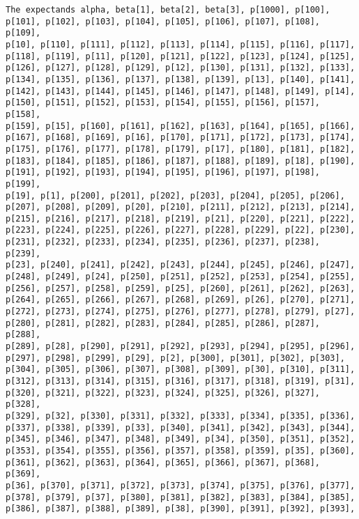 \documentclass[
  letterpaper,
  DIV=11,
  numbers=noendperiod]{scrartcl}
\begin{document}
\begin{verbatim}
The expectands alpha, beta[1], beta[2], beta[3], p[1000], p[100],
p[101], p[102], p[103], p[104], p[105], p[106], p[107], p[108], p[109],
p[10], p[110], p[111], p[112], p[113], p[114], p[115], p[116], p[117],
p[118], p[119], p[11], p[120], p[121], p[122], p[123], p[124], p[125],
p[126], p[127], p[128], p[129], p[12], p[130], p[131], p[132], p[133],
p[134], p[135], p[136], p[137], p[138], p[139], p[13], p[140], p[141],
p[142], p[143], p[144], p[145], p[146], p[147], p[148], p[149], p[14],
p[150], p[151], p[152], p[153], p[154], p[155], p[156], p[157], p[158],
p[159], p[15], p[160], p[161], p[162], p[163], p[164], p[165], p[166],
p[167], p[168], p[169], p[16], p[170], p[171], p[172], p[173], p[174],
p[175], p[176], p[177], p[178], p[179], p[17], p[180], p[181], p[182],
p[183], p[184], p[185], p[186], p[187], p[188], p[189], p[18], p[190],
p[191], p[192], p[193], p[194], p[195], p[196], p[197], p[198], p[199],
p[19], p[1], p[200], p[201], p[202], p[203], p[204], p[205], p[206],
p[207], p[208], p[209], p[20], p[210], p[211], p[212], p[213], p[214],
p[215], p[216], p[217], p[218], p[219], p[21], p[220], p[221], p[222],
p[223], p[224], p[225], p[226], p[227], p[228], p[229], p[22], p[230],
p[231], p[232], p[233], p[234], p[235], p[236], p[237], p[238], p[239],
p[23], p[240], p[241], p[242], p[243], p[244], p[245], p[246], p[247],
p[248], p[249], p[24], p[250], p[251], p[252], p[253], p[254], p[255],
p[256], p[257], p[258], p[259], p[25], p[260], p[261], p[262], p[263],
p[264], p[265], p[266], p[267], p[268], p[269], p[26], p[270], p[271],
p[272], p[273], p[274], p[275], p[276], p[277], p[278], p[279], p[27],
p[280], p[281], p[282], p[283], p[284], p[285], p[286], p[287], p[288],
p[289], p[28], p[290], p[291], p[292], p[293], p[294], p[295], p[296],
p[297], p[298], p[299], p[29], p[2], p[300], p[301], p[302], p[303],
p[304], p[305], p[306], p[307], p[308], p[309], p[30], p[310], p[311],
p[312], p[313], p[314], p[315], p[316], p[317], p[318], p[319], p[31],
p[320], p[321], p[322], p[323], p[324], p[325], p[326], p[327], p[328],
p[329], p[32], p[330], p[331], p[332], p[333], p[334], p[335], p[336],
p[337], p[338], p[339], p[33], p[340], p[341], p[342], p[343], p[344],
p[345], p[346], p[347], p[348], p[349], p[34], p[350], p[351], p[352],
p[353], p[354], p[355], p[356], p[357], p[358], p[359], p[35], p[360],
p[361], p[362], p[363], p[364], p[365], p[366], p[367], p[368], p[369],
p[36], p[370], p[371], p[372], p[373], p[374], p[375], p[376], p[377],
p[378], p[379], p[37], p[380], p[381], p[382], p[383], p[384], p[385],
p[386], p[387], p[388], p[389], p[38], p[390], p[391], p[392], p[393],

\end{verbatim}
\end{document}
